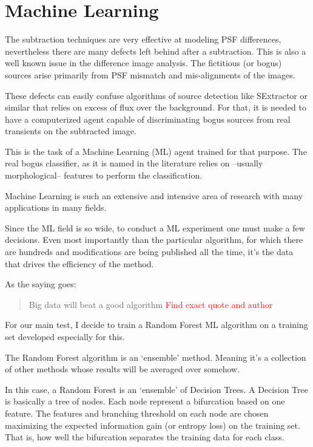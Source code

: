 \chapter{Machine Learning}

The subtraction techniques are very effective at  modeling PSF differences, nevertheless there are many defects left behind after a subtraction. This is also a well known issue in the difference image analysis. The fictitious (or bogus) sources arise primarily from PSF mismatch and mis-alignments of the images.

These defects can easily confuse algorithms of source detection like SExtractor or similar that relies on excess of flux over the background. For that, it is needed to have a computerized agent capable of discriminating bogus sources from real transients on the subtracted image. 

This is the task of a Machine Learning (ML) agent trained for that purpose. The real bogus classifier, as it is named in the literature relies on --usually morphological-- features to perform the classification.

Machine Learning is such an extensive and intensive area of research with many applications in many fields.

Since the ML field is so wide, to conduct a ML experiment one must make a few decisions. Even most importantly than the particular algorithm, for which there are hundreds and modifications are being published all the time, it's the data that drives the efficiency of the method.

As the saying goes:

\begin{quotation}
Big data will beat a good algorithm \textcolor{red}{Find exact quote and author}
\end{quotation}


For our main test, I decide to train a Random Forest ML algorithm on a training set developed especially for this.

The Random Forest algorithm is an `ensemble' method. Meaning it's a collection of other methods whose results will be averaged over somehow.

In this case, a Random Forest is an `ensemble' of Decision Trees. A Decision Tree is basically a tree of nodes. Each node represent a bifurcation based on one feature. The features and branching threshold on each node are chosen maximizing the expected information gain (or entropy loss) on the training set. That is, how well the bifurcation separates the training data for each class.

